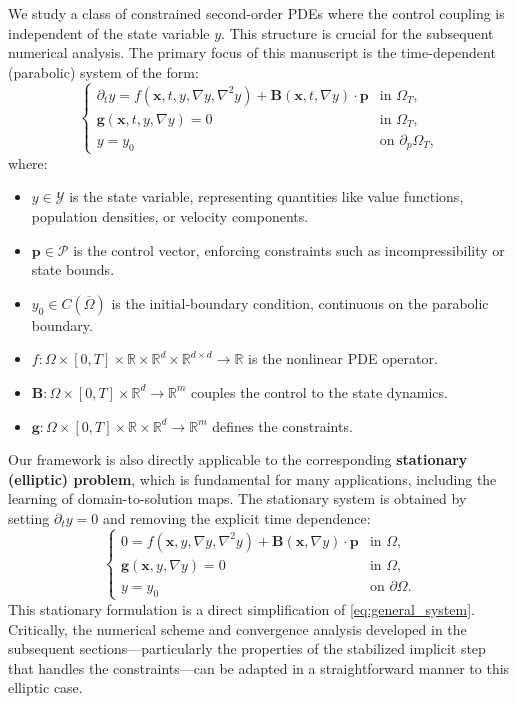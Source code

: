 \documentclass[pdflatex,sn-mathphys-num]{sn-jnl}%
\theoremstyle{thmstyleone}%
\numberwithin{equation}{section}
\begin{document}
We study a class of constrained second-order PDEs where the control coupling is independent of the state variable $y$. This structure is crucial for the subsequent numerical analysis. The primary focus of this manuscript is the time-dependent (parabolic) system of the form:
\begin{equation}
\label{eq:general_system}
\begin{cases}
\partial_t y = f(\bm{x}, t, y, \nabla y, \nabla^2 y) + \bm{B}(\bm{x}, t, \nabla y) \cdot \bm{p} & \text{in } \Omega_T, \\
\bm{g}(\bm{x}, t, y, \nabla y) = 0 & \text{in } \Omega_T, \\
y = y_0 & \text{on } \partial_p \Omega_T,
\end{cases}
\end{equation}
where:
\begin{itemize}
    \item \( y \in \mathcal{Y} \) is the state variable, representing quantities like value functions, population densities, or velocity components.
    \item \( \bm{p} \in \mathcal{P} \) is the control vector, enforcing constraints such as incompressibility or state bounds.
    \item \( y_0 \in C(\overline{\Omega}) \) is the initial-boundary condition, continuous on the parabolic boundary.
    \item \( f: \Omega \times [0,T] \times \mathbb{R} \times \mathbb{R}^d \times \mathbb{R}^{d \times d} \to \mathbb{R} \) is the nonlinear PDE operator.
    \item \( \bm{B}: \Omega \times [0,T] \times \mathbb{R}^d \to \mathbb{R}^m \) couples the control to the state dynamics.
    \item \( \bm{g}: \Omega \times [0,T] \times \mathbb{R} \times \mathbb{R}^d \to \mathbb{R}^m \) defines the constraints.
\end{itemize}
Our framework is also directly applicable to the corresponding \textbf{stationary (elliptic) problem}, which is fundamental for many applications, including the learning of domain-to-solution maps. The stationary system is obtained by setting $\partial_t y = 0$ and removing the explicit time dependence:
\begin{equation}
\label{eq:general_system_stationary}
\begin{cases}
0 = f(\bm{x}, y, \nabla y, \nabla^2 y) + \bm{B}(\bm{x}, \nabla y) \cdot \bm{p} & \text{in } \Omega, \\
\bm{g}(\bm{x}, y, \nabla y) = 0 & \text{in } \Omega, \\
y = y_0 & \text{on } \partial \Omega.
\end{cases}
\end{equation}
This stationary formulation is a direct simplification of \eqref{eq:general_system}. Critically, the numerical scheme and convergence analysis developed in the subsequent sections—particularly the properties of the stabilized implicit step that handles the constraints—can be adapted in a straightforward manner to this elliptic case.
\end{document}
